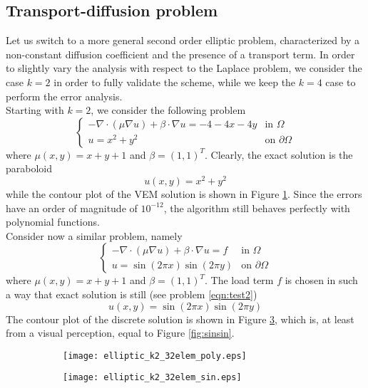\documentclass[10pt]{article}
\begin{document}
\subsection{Transport-diffusion problem}
Let us switch to a more general second order elliptic problem, characterized by a non-constant diffusion coefficient and the presence of a transport term.
In order to slightly vary the analysis with respect to the Laplace problem, we consider the case $k=2$ in order to fully validate the scheme, while we keep the $k=4$ case to perform the error analysis. \\
Starting with $k=2$, we consider the following problem
\begin{equation}
\begin{cases}
-\nabla \cdot (\mu \nabla u)+\beta \cdot \nabla u = -4-4x-4y & \mbox{in } \Omega \\
u = x^2+y^2 & \mbox{on } \partial \Omega
\end{cases}
\label{eqn:test3}
\end{equation}
where $\mu(x,y)=x+y+1$ and $\beta=(1,1)^T$. Clearly, the exact solution is the paraboloid
$$u(x,y)=x^2+y^2$$ while the contour plot of the VEM solution is shown in Figure \ref{fig:ell_polynomial}. Since the errors have an order of magnitude of $10^{-12}$, the algorithm still behaves perfectly with polynomial functions. \\
Consider now a similar problem, namely
\begin{equation}
\begin{cases}
-\nabla \cdot (\mu \nabla u)+\beta \cdot \nabla u = f & \mbox{in } \Omega \\
u = \sin(2\pi x) \sin(2 \pi y) & \mbox{on } \partial \Omega
\end{cases}
\label{eqn:test4}
\end{equation}
where $\mu(x,y)=x+y+1$ and $\beta=(1,1)^T$. The load term $f$ is chosen in such a way that exact solution is still (see problem \eqref{eqn:test2})
$$u(x,y)=\sin(2\pi x) \sin(2 \pi y)$$ The contour plot of the discrete solution is shown in Figure \ref{fig:ell_sinsin}, which is, at least from a visual perception, equal to Figure \ref{fig:sinsin}.
\begin{figure}[H]
	\centering
	\begin{subfigure}{0.49\textwidth}
		\centering
		\texttt{[image: elliptic\_k2\_32elem\_poly.eps]}
		\label{fig:ell_polynomial}
	\end{subfigure}
	\begin{subfigure}{0.49\textwidth}
		\centering
		\texttt{[image: elliptic\_k2\_32elem\_sin.eps]}
		\label{fig:ell_sinsin}
	\end{subfigure}
\end{figure} 
\end{document}
